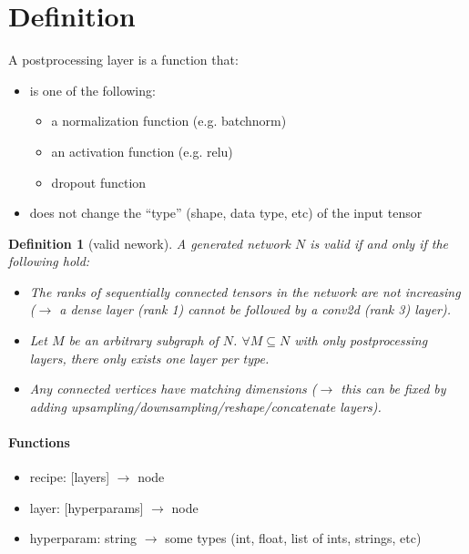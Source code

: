 \documentclass[12pt]{article}
\newtheorem{definition}{Definition}
\begin{document}
\maketitle


\section{Definition}

A postprocessing layer is a function that:
\begin{itemize}
\item is one of the following:
  \begin{itemize}
  \item a normalization function (e.g. batchnorm)
  \item an activation function (e.g. relu)
  \item dropout function
  \end{itemize}
\item does not change the ``type'' (shape, data type, etc) of the input tensor
\end{itemize}

\begin{definition}[valid nework]
  A generated network $N$ is valid if and only if the following hold:
  \begin{itemize}
    \item The ranks of sequentially connected tensors in the network are not increasing ($\rightarrow$ a dense layer (rank 1) cannot be followed by a conv2d (rank 3) layer).
  \item Let $M$ be an arbitrary subgraph of $N$. $\forall M\subseteq N$ with only postprocessing layers, there only exists one layer per type.
  \item Any connected vertices have matching dimensions ($\rightarrow$ this can be fixed by adding upsampling/downsampling/reshape/concatenate layers).
    \end{itemize}
  \end{definition}

\paragraph{Functions}
  \begin{itemize}
\item recipe: [layers] $\rightarrow$ node
\item layer: [hyperparams] $\rightarrow$ node
\item hyperparam: string $\rightarrow$ some types (int, float, list of ints, strings, etc)

    \end{itemize}


\end{document}
